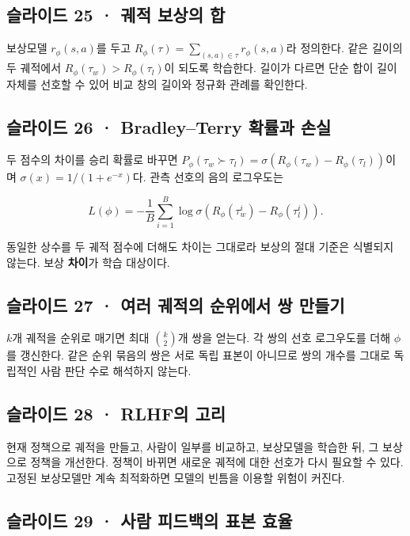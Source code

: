 \documentclass[11pt,a4paper]{article}
\begin{document}
\subsection{슬라이드 25 · 궤적 보상의 합}

보상모델 $r_\phi(s,a)$를 두고 $R_\phi(\tau)=\sum_{(s,a)\in\tau}r_\phi(s,a)$라 정의한다. 같은 길이의 두 궤적에서 $R_\phi(\tau_w)>R_\phi(\tau_l)$이 되도록 학습한다. 길이가 다르면 단순 합이 길이 자체를 선호할 수 있어 비교 창의 길이와 정규화 관례를 확인한다.\par

\subsection{슬라이드 26 · Bradley–Terry 확률과 손실}

두 점수의 차이를 승리 확률로 바꾸면 $P_\phi(\tau_w\succ\tau_l)=\sigma(R_\phi(\tau_w)-R_\phi(\tau_l))$이며 $\sigma(x)=1/(1+e^{-x})$다. 관측 선호의 음의 로그우도는\par

\[
L(\phi)=-\frac1B\sum_{i=1}^{B}\log\sigma\!\left(R_\phi(\tau_w^i)-R_\phi(\tau_l^i)\right).
\]

동일한 상수를 두 궤적 점수에 더해도 차이는 그대로라 보상의 절대 기준은 식별되지 않는다. 보상 \textbf{차이}가 학습 대상이다.\par

\subsection{슬라이드 27 · 여러 궤적의 순위에서 쌍 만들기}

$k$개 궤적을 순위로 매기면 최대 $\binom{k}{2}$개 쌍을 얻는다. 각 쌍의 선호 로그우도를 더해 $\phi$를 갱신한다. 같은 순위 묶음의 쌍은 서로 독립 표본이 아니므로 쌍의 개수를 그대로 독립적인 사람 판단 수로 해석하지 않는다.\par

\subsection{슬라이드 28 · RLHF의 고리}

현재 정책으로 궤적을 만들고, 사람이 일부를 비교하고, 보상모델을 학습한 뒤, 그 보상으로 정책을 개선한다. 정책이 바뀌면 새로운 궤적에 대한 선호가 다시 필요할 수 있다. 고정된 보상모델만 계속 최적화하면 모델의 빈틈을 이용할 위험이 커진다.\par

\subsection{슬라이드 29 · 사람 피드백의 표본 효율}
\end{document}
